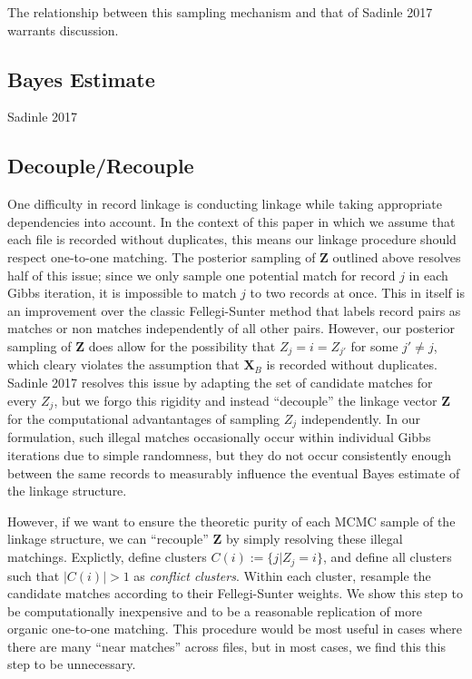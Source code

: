 \documentclass[
  12pt,
]{article}
\begin{document}
The relationship between this sampling mechanism and that of Sadinle
2017 warrants discussion.

\hypertarget{bayes-estimate}{%
\subsection{Bayes Estimate}\label{bayes-estimate}}

Sadinle 2017

\hypertarget{decouplerecouple}{%
\subsection{Decouple/Recouple}\label{decouplerecouple}}

One difficulty in record linkage is conducting linkage while taking
appropriate dependencies into account. In the context of this paper in
which we assume that each file is recorded without duplicates, this
means our linkage procedure should respect one-to-one matching. The
posterior sampling of \(\mathbf{Z}\) outlined above resolves half of
this issue; since we only sample one potential match for record \(j\) in
each Gibbs iteration, it is impossible to match \(j\) to two records at
once. This in itself is an improvement over the classic Fellegi-Sunter
method that labels record pairs as matches or non matches independently
of all other pairs. However, our posterior sampling of \(\mathbf{Z}\)
does allow for the possibility that \(Z_j = i = Z_{j'}\) for some
\(j' \neq j\), which cleary violates the assumption that
\(\mathbf{X}_B\) is recorded without duplicates. Sadinle 2017 resolves
this issue by adapting the set of candidate matches for every \(Z_j\),
but we forgo this rigidity and instead ``decouple'' the linkage vector
\(\mathbf{Z}\) for the computational advantantages of sampling \(Z_j\)
independently. In our formulation, such illegal matches occasionally
occur within individual Gibbs iterations due to simple randomness, but
they do not occur consistently enough between the same records to
measurably influence the eventual Bayes estimate of the linkage
structure.

However, if we want to ensure the theoretic purity of each MCMC sample
of the linkage structure, we can ``recouple'' \(\mathbf{Z}\) by simply
resolving these illegal matchings. Explictly, define clusters
\(C(i) := \{j | Z_j = i\}\), and define all clusters such that
\(|C(i)| > 1\) as \emph{conflict clusters}. Within each cluster,
resample the candidate matches according to their Fellegi-Sunter
weights. We show this step to be computationally inexpensive and to be a
reasonable replication of more organic one-to-one matching. This
procedure would be most useful in cases where there are many ``near
matches'' across files, but in most cases, we find this this step to be
unnecessary.
\end{document}
